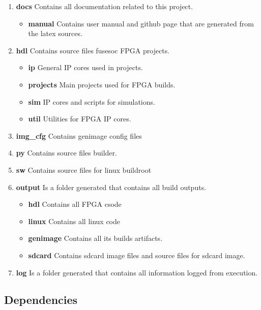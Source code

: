 \begin{enumerate}
  \item \textbf{docs} Contains all documentation related to this project.
    \begin{itemize}
      \item \textbf{manual} Contains user manual and github page that are generated from the latex sources.
    \end{itemize}
  \item \textbf{hdl} Contains source files fusesoc FPGA projects.
  \begin{itemize}
    \item \textbf{ip} General IP cores used in projects.
    \item \textbf{projects} Main projects used for FPGA builds.
    \item \textbf{sim} IP cores and scripts for simulations.
    \item \textbf{util} Utilities for FPGA IP cores.
  \end{itemize}
  \item \textbf{img\_cfg} Contains genimage config files
  \item \textbf{py} Contains source files builder.
  \item \textbf{sw} Contains source files for linux buildroot
  \item \textbf{output} Is a folder generated that contains all build outputs.
  \begin{itemize}
    \item \textbf{hdl} Contains all FPGA csode
    \item \textbf{linux} Contains all linux code
    \item \textbf{genimage} Contains all its builds artifacts.
    \item \textbf{sdcard} Contains sdcard image files and source files for sdcard image.
  \end{itemize}
  \item \textbf{log} Is a folder generated that contains all information logged from execution.
\end{enumerate}

\subsection{Dependencies}

